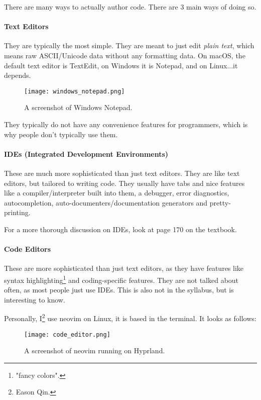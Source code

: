 \documentclass[../main.tex]{subfiles}
\begin{document}
There are many ways to actually author code. There are 3 main ways of doing so.

\paragraph{Text Editors}

They are typically the most simple. They are meant to just edit \emph{plain text}, which means raw ASCII/Unicode data without any formatting data. On macOS, the default text editor is TextEdit, on Windows it is Notepad, and on Linux...it depends.

\begin{figure}[H]
    \centering
    \texttt{[image: windows\_notepad.png]}
    \caption{A screenshot of Windows Notepad.}
    \label{fig:windows_notepad}
\end{figure}

They typically do not have any convenience features for programmers, which is why people don't typically use them.

\paragraph{IDEs (Integrated Development Environments)}

These are much more sophisticated than just text editors. They are like text editors, but tailored to writing code. They usually have tabs and nice features like a compiler/interpreter built into them, a debugger, error diagnostics, autocompletion, auto-documenters/documentation generators and pretty-printing.

For a more thorough discussion on IDEs, look at page 170 on the textbook.

\paragraph{Code Editors}

These are more sophisticated than just text editors, as they have features like syntax highlighting\footnote{"fancy colors".} and coding-specific features. They are not talked about often, as most people just use IDEs. This is also not in the syllabus, but is interesting to know.

Personally, I\footnote{Eason Qin.} use {\ccmono neovim} on Linux, it is based in the terminal. It looks as follows:

\begin{figure}[H]
    \centering
    \texttt{[image: code\_editor.png]}
    \caption{A screenshot of neovim running on Hyprland.}
    \label{fig:code_editor}
\end{figure}
\end{document}
